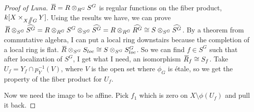 \begin{proof}[Proof of Luna]
 $\bbar R=R\otimes_{R^G} S^G$ is regular functions on the fiber product, $k[X\times_{X\mbox{\rm /\!\!/} G}Y]$. Using the results we have, we can prove $\bbar R\otimes_{S^G} \hhat{S^G} = R\otimes_{R^G} S^G\otimes_{S^G}\hhat{S^G} = R\otimes_{R^G}\hhat{R^G}\cong S\otimes_{S^G}\hhat{S^G}$. By a theorem from commutative algebra, I can put a local ring downstairs because the completion of a local ring is flat. $\bbar R\otimes_{S^G} S_{loc}\cong S\otimes_{S^G}S_{loc}^G$. So we can find $f\in S^G$ such that after localization of $S^G$, I get what I need, an isomorphism $\bbar R_f\cong S_f$. Take $U_f=Y_f\cap p_Y^{-1}(V)$, where $V$ is the open set where $\phi_G$ is \'etale, so we get the property of the fiber product for $U_f$.
 
 Now we need the image to be affine. Pick $f_1$ which is zero on $X\setminus \phi(U_f)$ and pull it back.
\end{proof}
